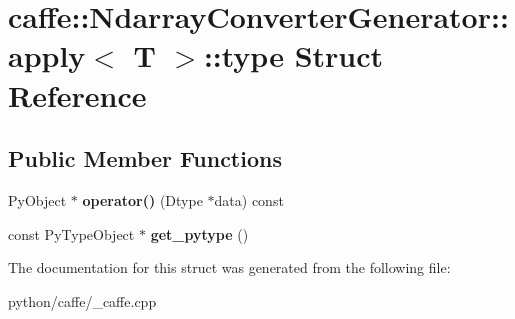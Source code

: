 \hypertarget{structcaffe_1_1_ndarray_converter_generator_1_1apply_3_01_dtype_01_5_01_4_1_1type}{}\section{caffe\+:\+:Ndarray\+Converter\+Generator\+:\+:apply$<$ T $>$\+:\+:type Struct Reference}
\label{structcaffe_1_1_ndarray_converter_generator_1_1apply_3_01_dtype_01_5_01_4_1_1type}
\subsection*{Public Member Functions}
\begin{DoxyCompactItemize}
\item 
\mbox{\label{structcaffe_1_1_ndarray_converter_generator_1_1apply_3_01_dtype_01_5_01_4_1_1type_a3691e7a0cf90f23953bcdf5fa675edb0}} 
Py\+Object $\ast$ {\bfseries operator()} (Dtype $\ast$data) const
\item 
\mbox{\label{structcaffe_1_1_ndarray_converter_generator_1_1apply_3_01_dtype_01_5_01_4_1_1type_a2308d8a92e6f89e52e4b3de26a6c4eae}} 
const Py\+Type\+Object $\ast$ {\bfseries get\+\_\+pytype} ()
\end{DoxyCompactItemize}


The documentation for this struct was generated from the following file\+:\begin{DoxyCompactItemize}
\item 
python/caffe/\+\_\+caffe.\+cpp\end{DoxyCompactItemize}
